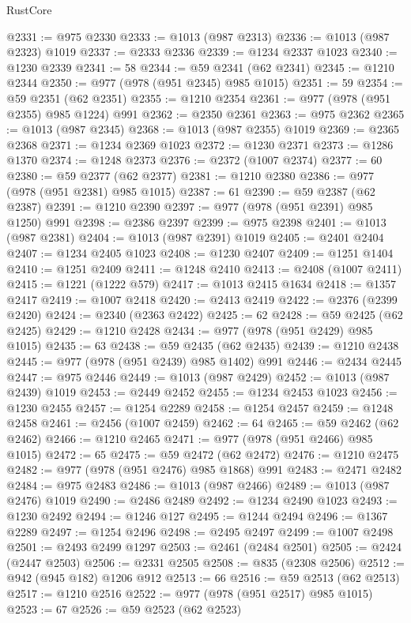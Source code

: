 \begin{lexlean}{RustCore}
\begin{coremodule}
@2331 := @975 @2330
@2333 := @1013 (@987 @2313)
@2336 := @1013 (@987 @2323) @1019
@2337 := @2333 @2336
@2339 := @1234 @2337 @1023
@2340 := @1230 @2339
@2341 := 58
@2344 := @59 @2341 (@62 @2341)
@2345 := @1210 @2344
@2350 := @977 (@978 (@951 @2345) @985 @1015)
@2351 := 59
@2354 := @59 @2351 (@62 @2351)
@2355 := @1210 @2354
@2361 := @977 (@978 (@951 @2355) @985 @1224) @991
@2362 := @2350 @2361
@2363 := @975 @2362
@2365 := @1013 (@987 @2345)
@2368 := @1013 (@987 @2355) @1019
@2369 := @2365 @2368
@2371 := @1234 @2369 @1023
@2372 := @1230 @2371
@2373 := @1286 @1370
@2374 := @1248 @2373
@2376 := @2372 (@1007 @2374)
@2377 := 60
@2380 := @59 @2377 (@62 @2377)
@2381 := @1210 @2380
@2386 := @977 (@978 (@951 @2381) @985 @1015)
@2387 := 61
@2390 := @59 @2387 (@62 @2387)
@2391 := @1210 @2390
@2397 := @977 (@978 (@951 @2391) @985 @1250) @991
@2398 := @2386 @2397
@2399 := @975 @2398
@2401 := @1013 (@987 @2381)
@2404 := @1013 (@987 @2391) @1019
@2405 := @2401 @2404
@2407 := @1234 @2405 @1023
@2408 := @1230 @2407
@2409 := @1251 @1404
@2410 := @1251 @2409
@2411 := @1248 @2410
@2413 := @2408 (@1007 @2411)
@2415 := @1221 (@1222 @579)
@2417 := @1013 @2415 @1634
@2418 := @1357 @2417
@2419 := @1007 @2418
@2420 := @2413 @2419
@2422 := @2376 (@2399 @2420)
@2424 := @2340 (@2363 @2422)
@2425 := 62
@2428 := @59 @2425 (@62 @2425)
@2429 := @1210 @2428
@2434 := @977 (@978 (@951 @2429) @985 @1015)
@2435 := 63
@2438 := @59 @2435 (@62 @2435)
@2439 := @1210 @2438
@2445 := @977 (@978 (@951 @2439) @985 @1402) @991
@2446 := @2434 @2445
@2447 := @975 @2446
@2449 := @1013 (@987 @2429)
@2452 := @1013 (@987 @2439) @1019
@2453 := @2449 @2452
@2455 := @1234 @2453 @1023
@2456 := @1230 @2455
@2457 := @1254 @2289
@2458 := @1254 @2457
@2459 := @1248 @2458
@2461 := @2456 (@1007 @2459)
@2462 := 64
@2465 := @59 @2462 (@62 @2462)
@2466 := @1210 @2465
@2471 := @977 (@978 (@951 @2466) @985 @1015)
@2472 := 65
@2475 := @59 @2472 (@62 @2472)
@2476 := @1210 @2475
@2482 := @977 (@978 (@951 @2476) @985 @1868) @991
@2483 := @2471 @2482
@2484 := @975 @2483
@2486 := @1013 (@987 @2466)
@2489 := @1013 (@987 @2476) @1019
@2490 := @2486 @2489
@2492 := @1234 @2490 @1023
@2493 := @1230 @2492
@2494 := @1246 @127
@2495 := @1244 @2494
@2496 := @1367 @2289
@2497 := @1254 @2496
@2498 := @2495 @2497
@2499 := @1007 @2498
@2501 := @2493 @2499 @1297
@2503 := @2461 (@2484 @2501)
@2505 := @2424 (@2447 @2503)
@2506 := @2331 @2505
@2508 := @835 (@2308 @2506)
@2512 := @942 (@945 @182) @1206 @912
@2513 := 66
@2516 := @59 @2513 (@62 @2513)
@2517 := @1210 @2516
@2522 := @977 (@978 (@951 @2517) @985 @1015)
@2523 := 67
@2526 := @59 @2523 (@62 @2523)

\end{coremodule}
\end{lexlean}
